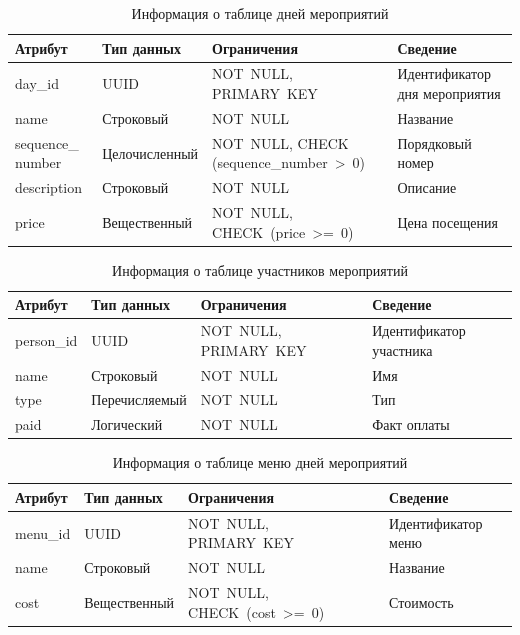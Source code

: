 \begin{table}[h!]
	\centering
	\caption{Информация о таблице дней мероприятий}
	\begin{tabularx}{\textwidth}{|p{2.6cm}|X|p{6cm}|X|}
		\hline
		\textbf{Атрибут} & \textbf{Тип данных} & \textbf{Ограничения} & \textbf{Сведение} \\
		\hline
		day\_id & UUID & NOT~NULL, \newline PRIMARY~KEY & Идентификатор дня мероприятия \\
		\hline
		name & Строковый & NOT~NULL & Название \\
		\hline
		sequence\_ number & Целочисленный & NOT~NULL, \newline CHECK (sequence\_number~>~0) & Порядковый номер \\
		\hline
		description & Строковый & NOT~NULL & Описание \\
		\hline
		price & Вещественный & NOT~NULL, \newline CHECK~(price~>=~0) & Цена посещения \\
		\hline
	\end{tabularx}
	\label{tbl:days}
\end{table}

\begin{table}[h!]
	\centering
	\caption{Информация о таблице участников мероприятий}
	\begin{tabularx}{\textwidth}{|p{2.6cm}|X|p{6cm}|X|}
		\hline
		\textbf{Атрибут} & \textbf{Тип данных} & \textbf{Ограничения} & \textbf{Сведение} \\
		\hline
		person\_id & UUID & NOT~NULL, \newline PRIMARY~KEY & Идентификатор участника \\
		\hline
		name & Строковый & NOT~NULL & Имя \\
		\hline
		type & Перечисляемый & NOT~NULL & Тип \\
		\hline
		paid & Логический & NOT~NULL & Факт оплаты \\
		\hline
	\end{tabularx}
	\label{tbl:persons}
\end{table}

\begin{table}[h!]
	\centering
	\caption{Информация о таблице меню дней мероприятий}
	\begin{tabularx}{\textwidth}{|p{2.6cm}|X|p{6cm}|X|}
		\hline
		\textbf{Атрибут} & \textbf{Тип данных} & \textbf{Ограничения} & \textbf{Сведение} \\
		\hline
		menu\_id & UUID & NOT~NULL, \newline PRIMARY~KEY & Идентификатор меню \\
		\hline
		name & Строковый & NOT~NULL & Название \\
		\hline
		cost & Вещественный & NOT~NULL, \newline CHECK~(cost~>=~0) & Стоимость \\
		\hline
	\end{tabularx}
	\label{tbl:menu}
\end{table}

